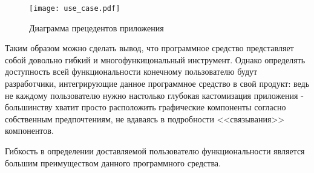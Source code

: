 \begin{figure}
\centering
    \texttt{[image: use\_case.pdf]}
    \caption{Диаграмма прецедентов приложения}
    \label{sec:design:use_case}
\end{figure}

Таким образом можно сделать вывод, что программное средство представляет собой довольно гибкий и многофункицональный инструмент. Однако определять доступность всей функциональности конечному пользователю будут разработчики, интегрирующие данное программное средство в свой продукт: ведь не каждому пользователю нужно настолько глубокая кастомизация приложения - большинству хватит просто расположить графические компоненты согласно собственным предпочтениям, не вдаваясь в подробности <<связывания>> компонентов.

Гибкость в определении доставляемой пользователю функциональности является большим преимуществом данного программного средства.

